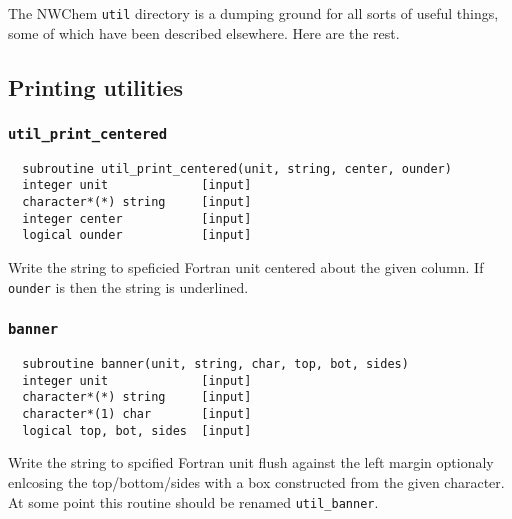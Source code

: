 
The NWChem {\tt util} directory is a dumping ground for all sorts of useful
things, some of which have been described elsewhere.  Here are the rest.

\subsection{Printing utilities}

\subsubsection{{\tt util\_print\_centered}}
\begin{verbatim}
  subroutine util_print_centered(unit, string, center, ounder)
  integer unit             [input]
  character*(*) string     [input]
  integer center           [input]
  logical ounder           [input]
\end{verbatim}
Write the string to speficied Fortran unit centered about the given
column.  If {\tt ounder} is \TRUE then the string is underlined.

\subsubsection{{\tt banner}}
\begin{verbatim}
  subroutine banner(unit, string, char, top, bot, sides)
  integer unit             [input]
  character*(*) string     [input]
  character*(1) char       [input]
  logical top, bot, sides  [input]
\end{verbatim}
Write the string to spcified Fortran unit flush against the left
margin optionaly enlcosing the top/bottom/sides with a box constructed
from the given character.  At some point this routine should be renamed
\verb+util_banner+. 


